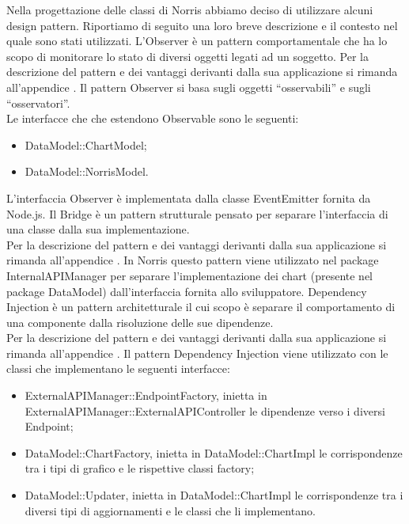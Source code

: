 			Nella progettazione delle classi di Norris abbiamo deciso di utilizzare alcuni design pattern. Riportiamo di seguito una loro breve descrizione e il contesto nel quale sono stati utilizzati.
				L'Observer è un pattern comportamentale che ha lo scopo di monitorare lo stato di diversi oggetti legati ad un soggetto.
				Per la descrizione del pattern e dei vantaggi derivanti dalla sua applicazione si rimanda all'appendice .
					Il pattern Observer si basa sugli oggetti “osservabili” e sugli “osservatori”.\\
					Le interfacce che che estendono Observable sono le seguenti:
					\begin{itemize}
						\item DataModel::ChartModel;
						\item DataModel::NorrisModel.
					\end{itemize}
					L'interfaccia Observer è implementata dalla classe EventEmitter fornita da Node.js.
				Il Bridge è un pattern strutturale pensato per separare l'interfaccia di una classe dalla sua implementazione.\\
				Per la descrizione del pattern e dei vantaggi derivanti dalla sua applicazione si rimanda all'appendice .
					In Norris questo pattern viene utilizzato nel package InternalAPIManager per separare l'implementazione dei chart (presente nel package DataModel) dall'interfaccia fornita allo sviluppatore.
				Dependency Injection è un pattern architetturale il cui scopo è separare il comportamento di una componente dalla risoluzione delle sue dipendenze.\\
				Per la descrizione del pattern e dei vantaggi derivanti dalla sua applicazione si rimanda all'appendice .
					Il pattern Dependency Injection viene utilizzato con le classi che implementano le seguenti interfacce:
					\begin{itemize}
						\item ExternalAPIManager::EndpointFactory, inietta in ExternalAPIManager::ExternalAPIController le dipendenze verso i diversi Endpoint;
						\item DataModel::ChartFactory, inietta in DataModel::ChartImpl le  corrispondenze tra i tipi di grafico e le rispettive classi factory;
						\item DataModel::Updater, inietta in DataModel::ChartImpl le corrispondenze tra i diversi tipi di aggiornamenti e le classi che li implementano.
					\end{itemize}
